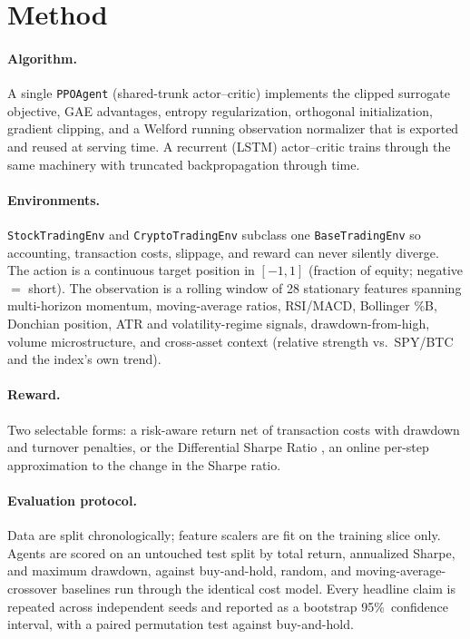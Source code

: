 \documentclass[10pt,twocolumn]{article}
\newcommand{\pc}{\%}  %
\begin{document}
\section{Method}
\paragraph{Algorithm.} A single \texttt{PPOAgent} (shared-trunk actor--critic)
implements the clipped surrogate objective, GAE advantages, entropy
regularization, orthogonal initialization, gradient clipping, and a Welford
\cite{welford1962} running observation normalizer that is exported and reused at
serving time. A recurrent (LSTM) actor--critic trains through the same machinery
with truncated backpropagation through time.

\paragraph{Environments.} \texttt{StockTradingEnv} and \texttt{CryptoTradingEnv}
subclass one \texttt{BaseTradingEnv} so accounting, transaction costs, slippage,
and reward can never silently diverge. The action is a continuous target position
in $[-1,1]$ (fraction of equity; negative $=$ short). The observation is a rolling
window of 28 stationary features spanning multi-horizon momentum, moving-average
ratios, RSI/MACD, Bollinger \%B, Donchian position, ATR and volatility-regime
signals, drawdown-from-high, volume microstructure, and cross-asset context
(relative strength vs.\ SPY/BTC and the index's own trend).

\paragraph{Reward.} Two selectable forms: a risk-aware return net of transaction
costs with drawdown and turnover penalties, or the Differential Sharpe Ratio
\cite{moody2001}, an online per-step approximation to the change in the Sharpe
ratio.

\paragraph{Evaluation protocol.} Data are split chronologically; feature scalers
are fit on the training slice only. Agents are scored on an untouched test split
by total return, annualized Sharpe, and maximum drawdown, against buy-and-hold,
random, and moving-average-crossover baselines run through the identical cost
model. Every headline claim is repeated across independent seeds and reported as a
bootstrap 95\pc\ confidence interval, with a paired permutation test against
buy-and-hold.
\end{document}
